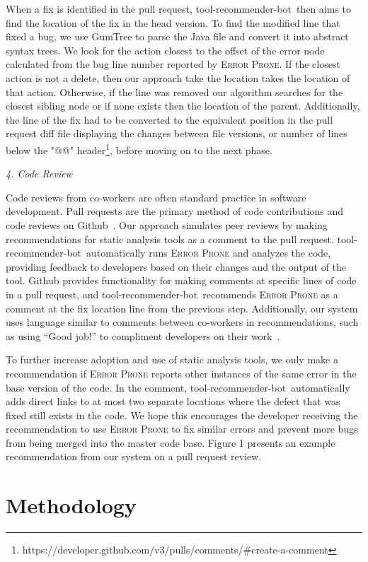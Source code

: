 \documentclass[conference]{IEEEtran}
\newcommand{\tool}{tool-recommender-bot}
\newcommand{\pseudosubsection}[1]{\vspace{2mm} {\it #1}}
\begin{document}
When a fix is identified in the pull request, \tool~then aims to find the location of the fix in the head version. To find the modified line that fixed a bug, we use GumTree to parse the Java file and convert it into abstract syntax trees. We look for the action closest to the offset of the error node calculated from the bug line number reported by \textsc{Error Prone}. If the closest action is not a delete, then our approach take the location takes the location of that action. Otherwise, if the line was removed our algorithm searches for the closest sibling node or if none exists then the location of the parent. Additionally, the line of the fix had to be converted to the equivalent position in the pull request diff file displaying the changes between file versions, or number of lines below the "@@" header\footnote{https://developer.github.com/v3/pulls/comments/\#create-a-comment}, before moving on to the next phase.

\pseudosubsection{4. Code Review}

Code reviews from co-workers are often standard practice in software development. Pull requests are the primary method of code contributions and code reviews on Github~\cite{PullRequestReview}. Our approach simulates peer reviews by making recommendations for static analysis tools as a comment to the pull request. \tool~automatically runs \textsc{Error Prone} and analyzes the code, providing feedback to developers based on their changes and the output of the tool. Github provides functionality for making comments at specific lines of code in a pull request, and \tool~recommends \textsc{Error Prone} as a comment at the fix location line from the previous step. Additionally, our system  uses language similar to comments between co-workers in recommendations, such as using ``Good job!'' to compliment developers on their work~\cite{?}.

To further increase adoption and use of static analysis tools, we only make a recommendation if \textsc{Error Prone} reports other instances of the same error in the base version of the code. In the comment, \tool~automatically adds direct links to at most two separate locations where the defect that was fixed still exists in the code. We hope this encourages the developer receiving the recommendation to use \textsc{Error Prone} to fix similar errors and prevent more bugs from being merged into the master code base. Figure 1 presents an example recommendation from our system on a pull request review.

\section{Methodology}
\end{document}
